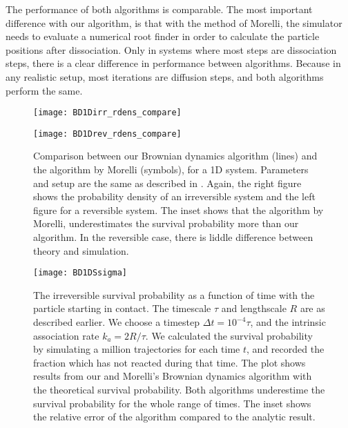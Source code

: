 The performance of both algorithms is comparable. The most important difference with our algorithm, is that with the method of Morelli, the simulator needs to evaluate a numerical root finder in order to calculate the particle positions after dissociation. Only in systems where most steps are dissociation steps, there is a clear difference in performance between algorithms. Because in any realistic setup, most iterations are diffusion steps, and both algorithms perform the same.

\begin{figure}[hb]
\begin{minipage}[ht]{.5\linewidth}
\centering
\texttt{[image: BD1Dirr\_rdens\_compare]}
\end{minipage}
\begin{minipage}[ht]{.5\linewidth}
\centering
\texttt{[image: BD1Drev\_rdens\_compare]}
\end{minipage}
\caption{ Comparison between our Brownian dynamics algorithm (lines) and the algorithm by Morelli \cite{Morelli2008a} (symbols), for a 1D system. Parameters and setup are the same as described in . Again, the right figure shows the probability density of an irreversible system and the left figure for a reversible system. The inset shows that the algorithm by Morelli, underestimates the survival probability more than our algorithm. In the reversible case, there is liddle difference between theory and simulation.}
\end{figure}

\begin{figure}[hb]
\centering
\texttt{[image: BD1DSsigma]}
\caption{ The irreversible survival probability as a function of time with the particle starting in contact. The timescale $\tau$ and lengthscale $R$ are as described earlier. We choose a timestep $\Delta t = 10^{-4} \tau$, and the intrinsic association rate $k_a=2 R/\tau$. We calculated the survival probability by simulating a million trajectories for each time $t$, and recorded the fraction which has not reacted during that time. The plot shows results from our and Morelli's Brownian dynamics algorithm with the theoretical survival probability. Both algorithms underestime the survival probability for the whole range of times. The inset shows the relative error of the algorithm compared to the analytic result.}
\end{figure}